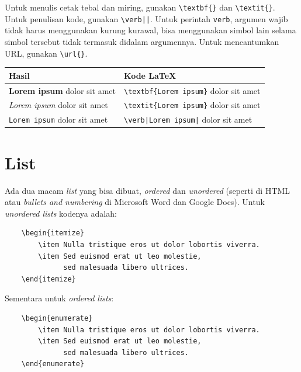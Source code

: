 Untuk menulis cetak tebal dan miring, gunakan \verb|\textbf{}| dan \verb|\textit{}|. Untuk penulisan kode, gunakan \verb/\verb||/. Untuk perintah \texttt{verb}, argumen wajib tidak harus menggunakan kurung kurawal, bisa menggunakan simbol lain selama simbol tersebut tidak termasuk didalam argumennya. Untuk mencantumkan URL, gunakan \verb|\url{}|.




\begin{table}[H]
    \centering
    \begin{tabular}{l  l}
        Hasil & Kode LaTeX \\
        \midrule
        \textbf{Lorem ipsum} dolor sit amet & \verb|\textbf{Lorem ipsum}| dolor sit amet \\
        \textit{Lorem ipsum} dolor sit amet & \verb|\textit{Lorem ipsum}| dolor sit amet \\
        \verb|Lorem ipsum| dolor sit amet & \verb[\verb|Lorem ipsum|[ dolor sit amet \\
    \end{tabular}
\end{table}

\section{List}

Ada dua macam \textit{list} yang bisa dibuat, \textit{ordered} dan \textit{unordered} (seperti di HTML atau \textit{bullets and numbering} di Microsoft Word dan Google Docs). Untuk \textit{unordered lists} kodenya adalah: 

\begin{verbatim}
    \begin{itemize}
        \item Nulla tristique eros ut dolor lobortis viverra.
        \item Sed euismod erat ut leo molestie, 
              sed malesuada libero ultrices.
    \end{itemize}
\end{verbatim}

Sementara untuk \textit{ordered lists}: 

\begin{verbatim}
    \begin{enumerate}
        \item Nulla tristique eros ut dolor lobortis viverra.
        \item Sed euismod erat ut leo molestie, 
              sed malesuada libero ultrices.
    \end{enumerate}
\end{verbatim}


